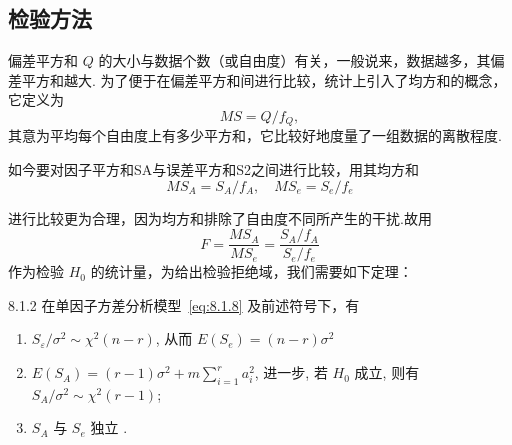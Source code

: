 \subsection{检验方法}

偏差平方和 $Q$ 的大小与数据个数（或自由度）有关，一般说来，数据越多，其偏差平方和越大. 为了便于在偏差平方和间进行比较，统计上引入了均方和的概念，它定义为 
\begin{equation*}
  MS=Q/f_Q,
\end{equation*}
其意为平均每个自由度上有多少平方和，它比较好地度量了一组数据的离散程度. 

如今要对因子平方和SA与误差平方和S2之间进行比较，用其均方和
\begin{equation*}
  MS_{A}=S_A / f_A, \quad MS_{e}=S_{e}/f_{e}
\end{equation*}


进行比较更为合理，因为均方和排除了自由度不同所产生的干扰.故用
\begin{equation}\label{eq:8.1.17}
  F = \frac{MS_{A}}{MS_{e}} = \frac{S_A/f_A}{S_e/f_e}
\end{equation}
作为检验 $H_0$ 的统计量，为给出检验拒绝域，我们需要如下定理：

\begin{theorem}{}{8.1.2}
  在单因子方差分析模型~\eqref{eq:8.1.8} 及前述符号下，有
  \begin{enumerate}
    \item $S_{\varepsilon} / \sigma^{2} \sim \chi^{2}(n-r)$, 从而 $E(S_{e})=(n-r) \sigma^{2}$ \label{enum:8.1.2.1}
    \item $E(S_{A})=(r-1) \sigma^{2} + m \sum\limits_{i=1}^{r} a_{i}^{2}$, 进一步, 若 $H_0$ 成立, 则有 $S_{A} / \sigma^{2} \sim \chi^{2}(r-1)$;\label{enum:8.1.2.2} 
    \item $S_A$ 与 $S_e$ 独立 \label{enum:8.1.2.3}.
  \end{enumerate}
\end{theorem}

